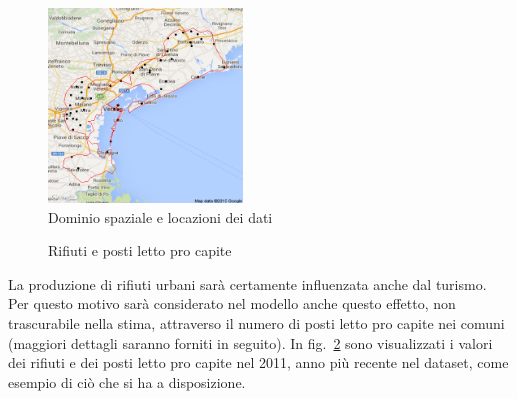 \documentclass[a4paper,11pt,twoside,openright]{book}							%
\begin{document}
\begin{figure}[h]
	\centering
	\includegraphics[width=0.46\textwidth]{Immagini/Ven_punti.png}   
   	\caption{Dominio spaziale e locazioni dei dati}
	\label{fig:intro}
\end{figure}
\newpage
\begin{figure}[t]
	\centering
	\caption{Rifiuti e posti letto pro capite}
	\label{fig:intro2}
\end{figure}
La produzione di rifiuti urbani sarà certamente influenzata anche dal turismo. Per questo motivo sarà considerato nel modello anche questo effetto, non trascurabile nella stima, attraverso il numero di posti letto pro capite nei comuni (maggiori dettagli saranno forniti in seguito). In fig.~\ref{fig:intro2} sono visualizzati i valori dei rifiuti e dei posti letto pro capite nel 2011, anno più recente nel dataset, come esempio di ciò che si ha a disposizione.
\end{document}
